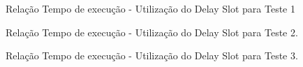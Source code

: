 \begin{figure}[H]
	\begin{center}
		\caption{Relação Tempo de execução - Utilização do Delay Slot para Teste 1}
		\label{tempexet1}
	\end{center}
\end{figure}

\begin{figure}[H]
	\begin{center}
		\caption{Relação Tempo de execução - Utilização do Delay Slot para Teste 2.}
		\label{tempexet2}
	\end{center}
\end{figure}

\begin{figure}[H]
	\begin{center}
		\caption{Relação Tempo de execução - Utilização do Delay Slot para Teste 3.}
		\label{tempexet3}
	\end{center}
\end{figure}

